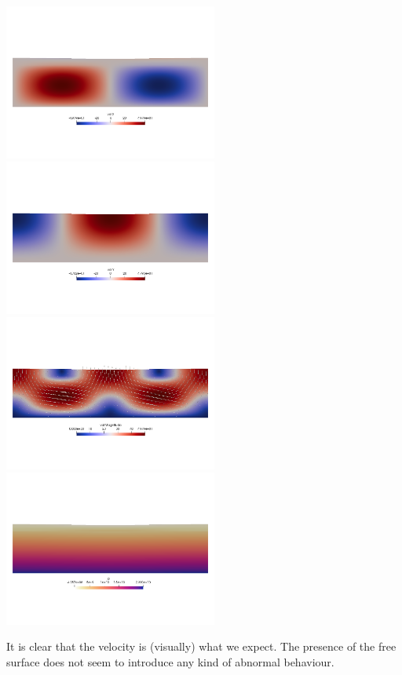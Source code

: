 \begin{center}
\includegraphics[width=7cm]{python_codes/fieldstone_72/results/crsg12/u}
\includegraphics[width=7cm]{python_codes/fieldstone_72/results/crsg12/v}\\
\includegraphics[width=7cm]{python_codes/fieldstone_72/results/crsg12/vel}
\includegraphics[width=7cm]{python_codes/fieldstone_72/results/crsg12/p}
\end{center}

It is clear that the velocity is (visually) what we expect. The presence of the free surface 
does not seem to introduce any kind of abnormal behaviour. 


